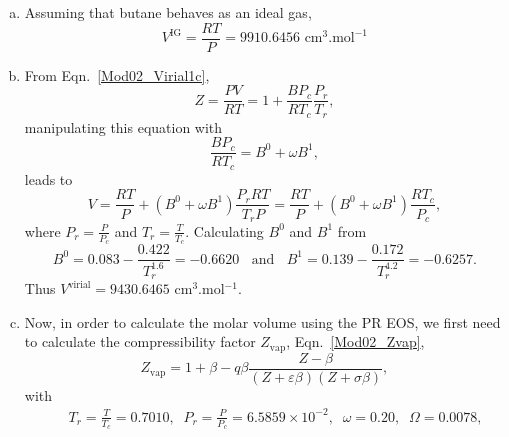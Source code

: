 \documentclass[12pts,a4paper,amsmath,amssymb,floatfix]{article}%
\newcommand{\frc}{\displaystyle\frac}
\begin{document}
\begin{enumerate}[1)]
           \begin{enumerate}[a)]
%
               \item Assuming that butane behaves as an ideal gas,
                    \begin{displaymath}
                        V^{\text{IG}} = \frc{RT}{P} = 9910.6456 \text{ cm}^{3}.\text{mol}^{-1}
                    \end{displaymath}
%
               \item From Eqn.~\ref{Mod02_Virial1c},
                  \begin{displaymath}
                     Z = \frc{P V}{R T} = 1 + \frc{B P_{c}}{R T_{c}}\frc{P_{r}}{T_{r}},
                  \end{displaymath}
                  manipulating this equation with 
                  \begin{displaymath}
                     \frc{B P_{c}}{R T_{c}} = B^{0} + \omega B^{1},
                  \end{displaymath}
                  leads to
                  \begin{displaymath}
                     V = \frc{R T}{P} + \left(B^{0} + \omega B^{1}\right) \frc{P_{r}R T}{T_{r}P} = \frc{R T}{P} + \left(B^{0} + \omega B^{1}\right)\frc{RT_{c}}{P_{c}},
                  \end{displaymath}
                  where $P_{r}=\frac{P}{P_{c}}$ and $T_{r}=\frac{T}{T_{c}}$. Calculating $B^{0}$ and $B^{1}$ from
                  \begin{displaymath}
                     B^{0} = 0.083 - \frc{0.422}{T_{r}^{1.6}} = -0.6620\;\;\text{ and }\;\; B^{1} = 0.139 - \frc{0.172}{T_{r}^{4.2}}=-0.6257.
                  \end{displaymath}
                  Thus $V^{\text{virial}} = 9430.6465$ cm$^{3}$.mol$^{-1}$.
%
               \item Now, in order to calculate the molar volume using the PR EOS, we first need to calculate the compressibility factor $Z_{\text{vap}}$, Eqn.~\ref{Mod02_Zvap},
                  \begin{displaymath}
                     Z_{\text{vap}} = 1 + \beta - q\beta \frc{Z - \beta} {\left(Z+\varepsilon\beta\right)\left(Z+\sigma\beta\right)},
                  \end{displaymath}
                  with
                  \begin{eqnarray}
                     && T_{r}=\frc{T}{T_{c}} = 0.7010,\;\;P_{r}=\frc{P}{P_{c}}=6.5859\times 10^{-2},\;\;\omega=0.20,\;\;\Omega = 0.0078, \nonumber \\

\end{eqnarray}
\end{enumerate}
\end{enumerate}
\end{document}
